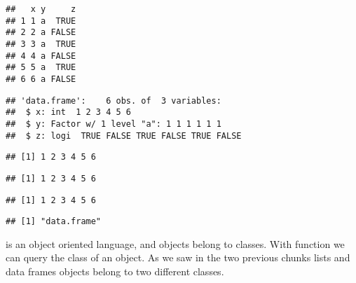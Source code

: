 \documentclass[paper=a4,headsepline,BCOR=12mm,twoside,open=right,%
titlepage,headings=small,fontsize=10pt,index=totoc,bibliography=totoc,%
captions=tableheading,captions=nooneline]{scrbook}\usepackage{knitr}
\begin{document}
\begin{knitrout}\footnotesize
{}\color{fgcolor}\begin{kframe}
\begin{alltt}
 \hlkwb{<-} \hlstd{(} \hlstd{=} \hlopt{:}\hlstd{,}  \hlstd{=} \hlstd{,}  \hlstd{=} \hlstd{(}\hlstd{,} \hlstd{))}
\end{alltt}
\begin{verbatim}
##   x y     z
## 1 1 a  TRUE
## 2 2 a FALSE
## 3 3 a  TRUE
## 4 4 a FALSE
## 5 5 a  TRUE
## 6 6 a FALSE
\end{verbatim}
\begin{alltt}
\end{alltt}
\begin{verbatim}
## 'data.frame':	6 obs. of  3 variables:
##  $ x: int  1 2 3 4 5 6
##  $ y: Factor w/ 1 level "a": 1 1 1 1 1 1
##  $ z: logi  TRUE FALSE TRUE FALSE TRUE FALSE
\end{verbatim}
\begin{alltt}
\hlopt{$}
\end{alltt}
\begin{verbatim}
## [1] 1 2 3 4 5 6
\end{verbatim}
\begin{alltt}
\hlstd{a.df[[}\hlstd{]]}
\end{alltt}
\begin{verbatim}
## [1] 1 2 3 4 5 6
\end{verbatim}
\begin{alltt}
\hlstd{a.df[[}\hlstd{]]}
\end{alltt}
\begin{verbatim}
## [1] 1 2 3 4 5 6
\end{verbatim}
\begin{alltt}
\end{alltt}
\begin{verbatim}
## [1] "data.frame"
\end{verbatim}
\end{kframe}
\end{knitrout}

\R is an object oriented language, and objects belong to classes. With function  we can query the class of an object. As we saw in the two previous chunks lists and data frames objects belong to two different classes.
\end{document}
